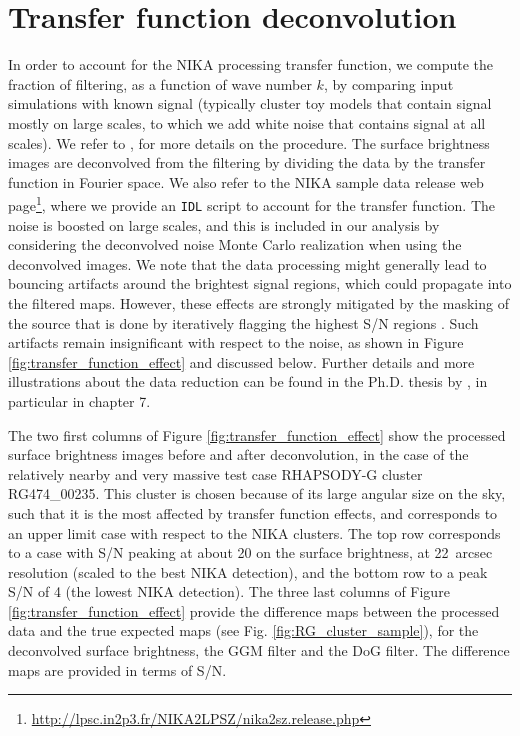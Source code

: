\documentclass[traditabstract]{aa}
\begin{document}
\section{Transfer function deconvolution}\label{sec:Transfer_function_deconvolution}
In order to account for the NIKA processing transfer function, we compute the fraction of filtering, as a function of wave number $k$, by comparing input simulations with known signal (typically cluster toy models that contain signal mostly on large scales, to which we add white noise that contains signal at all scales). We refer to \cite{Adam2015,Adam2016a}, for more details on the procedure. The surface brightness images are deconvolved from the filtering by dividing the data by the transfer function in Fourier space. We also refer to the NIKA sample data release web page\footnote{\url{http://lpsc.in2p3.fr/NIKA2LPSZ/nika2sz.release.php}}, where we provide an {\tt IDL} script to account for the transfer function. The noise is boosted on large scales, and this is included in our analysis by considering the deconvolved noise Monte Carlo realization when using the deconvolved images. We note that the data processing might generally lead to bouncing artifacts around the brightest signal regions, which could propagate into the filtered maps. However, these effects are strongly mitigated by the masking of the source that is done by iteratively flagging the highest S/N regions \citep[see][]{Adam2015}. Such artifacts remain insignificant with respect to the noise, as shown in Figure \ref{fig:transfer_function_effect} and discussed below. Further details and more illustrations about the data reduction can be found in the Ph.D. thesis by \cite{Adam2015Thesis}, in particular in chapter 7.

The two first columns of Figure \ref{fig:transfer_function_effect} show the processed surface brightness images before and after deconvolution, in the case of the relatively nearby and very massive test case RHAPSODY-G cluster RG474\_00235. This cluster is chosen because of its large angular size on the sky, such that it is the most affected by transfer function effects, and corresponds to an upper limit case with respect to the NIKA clusters. The top row corresponds to a case with S/N peaking at about 20 on the surface brightness, at 22~arcsec resolution (scaled to the best NIKA detection), and the bottom row to a peak S/N of 4 (the lowest NIKA detection). The three last columns of Figure \ref{fig:transfer_function_effect} provide the difference maps between the processed data and the true expected maps (see Fig. \ref{fig:RG_cluster_sample}), for the deconvolved surface brightness, the GGM filter and the DoG filter. The difference maps are provided in terms of S/N.
\end{document}
